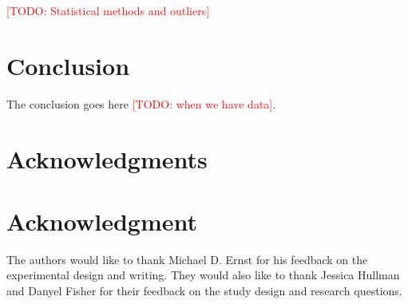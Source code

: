\documentclass[10pt,journal,compsoc]{IEEEtran}
\newcommand{\note}[2]{\textcolor{#1}{[#2]}}
\newcommand{\todo}[1]{\note{red}{TODO: #1}}
\begin{document}
\todo{Statistical methods and outliers}

\section{Conclusion}
The conclusion goes here \todo{when we have data}.


\ifCLASSOPTIONcompsoc
  \section*{Acknowledgments}
\else
  \section*{Acknowledgment}
\fi


The authors would like to thank Michael D. Ernst for his feedback on the experimental design and writing.
They would also like to thank Jessica Hullman and Danyel Fisher for their feedback on the study design and research questions.

\ifCLASSOPTIONcaptionsoff
  \newpage
\fi







%

\end{document}
